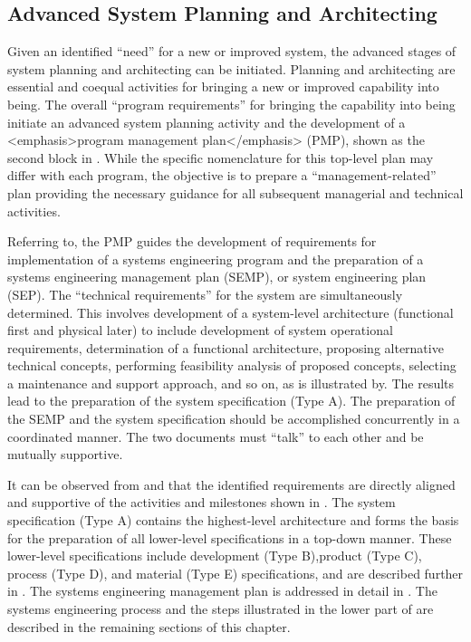\subsection{Advanced System Planning and Architecting}

Given an identified ``need'' for a new or improved system, the advanced stages of system planning and architecting can be initiated. Planning and architecting are essential and coequal activities for bringing a new or improved capability into being. The overall ``program requirements'' for bringing the capability into being initiate an advanced system planning activity and the development of a <emphasis>program management plan</emphasis> (PMP), shown as the second block in . While the specific nomenclature for this top-level plan may differ with each program, the objective is to prepare a ``management-related'' plan providing the necessary guidance for all subsequent managerial and technical activities.

Referring to, the PMP guides the development of requirements for implementation of a systems engineering program and the preparation of a systems engineering management plan (SEMP), or system engineering plan (SEP). The ``technical requirements'' for the system are simultaneously determined. This involves development of a system-level architecture (functional first and physical later) to include development of system operational requirements, determination of a functional architecture, proposing alternative technical concepts, performing feasibility analysis of proposed concepts, selecting a maintenance and support approach, and so on, as is illustrated by. The results lead to the preparation of the system specification (Type A). The preparation of the SEMP and the system specification should be accomplished concurrently in a coordinated manner. The two documents must ``talk'' to each other and be mutually supportive.

It can be observed from and  that the identified requirements are directly aligned and supportive of the activities and milestones shown in . The system specification (Type A) contains the highest-level architecture and forms the basis for the preparation of all lower-level specifications in a top-down manner. These lower-level specifications include development (Type B),product (Type C), process (Type D), and material (Type E) specifications, and are described further in . The systems engineering management plan is addressed in detail in . The systems engineering process and the steps illustrated in the lower part of are described in the remaining sections of this chapter.

